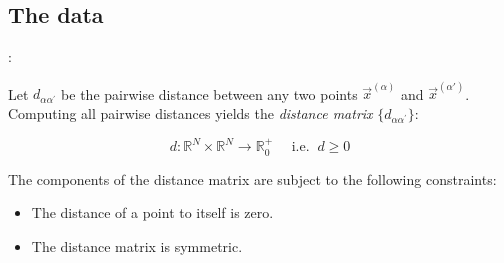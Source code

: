 \subsection{The data}

\begin{frame}{\secname:~\subsecname}


Let $d_{\alpha \alpha^{'}}$ be the pairwise distance between any two points $\vec x^{(\alpha)}$ and $\vec x^{(\alpha')}$. Computing all pairwise distances yields the \emph{distance matrix} $\big\{ d_{\alpha \alpha^{'}} \big\}$:

\begin{equation}
\label{eq:pairwisedistdef}
d: \mathbb{R}^N \times \mathbb{R}^N 
    \rightarrow \mathbb{R}_0^+ \quad\text{ i.e.}\;\; d \ge 0
\end{equation}

The components of the distance matrix are subject to the following constraints:
\begin{itemize}
\item The distance of a point to itself is zero.
\item The distance matrix is symmetric.
\end{itemize}

\end{frame}
